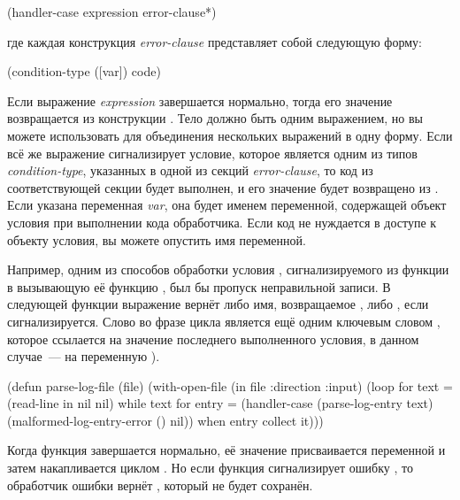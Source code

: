 \begin{myverb}
(handler-case expression
  error-clause*)
\end{myverb}

\noindent{}где каждая конструкция \textit{error-clause} представляет собой следующую форму:

\begin{myverb}
(condition-type ([var]) code)
\end{myverb}

Если выражение \textit{expression} завершается нормально, тогда его значение возвращается
из конструкции . Тело  должно быть одним выражением,
но вы можете использовать  для объединения нескольких выражений в одну
форму. Если всё же выражение сигнализирует условие, которое является одним из типов
\textit{condition-type}, указанных в одной из секций \textit{error-clause}, то код из
соответствующей секции будет выполнен, и его значение будет возвращено из
. Если указана переменная \textit{var}, она будет именем переменной,
содержащей объект условия при выполнении кода обработчика. Если код не нуждается в доступе
к объекту условия, вы можете опустить имя переменной.

Например, одним из способов обработки условия ,
сигнализируемого из функции  в вызывающую её функцию
, был бы пропуск неправильной записи. В следующей функции выражение
 вернёт либо имя, возвращаемое , либо ,
если  сигнализируется. Слово  во фразе
 цикла  является ещё одним ключевым словом ,
которое ссылается на значение последнего выполненного условия, в данном случае~--- на
переменную ).

\begin{myverb}
(defun parse-log-file (file)
  (with-open-file (in file :direction :input)
    (loop for text = (read-line in nil nil) while text
       for entry = (handler-case (parse-log-entry text)
                     (malformed-log-entry-error () nil))
       when entry collect it)))
\end{myverb}

Когда функция  завершается нормально, её значение присваивается
переменной  и затем накапливается циклом . Но если функция
 сигнализирует ошибку , то
обработчик ошибки вернёт , который не будет сохранён.

